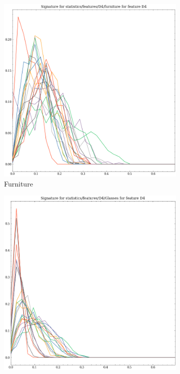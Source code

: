 \begin{figure}[t!p]
    \begin{subfigure}[b]{0.23\textwidth}
        \includegraphics[width=\textwidth]{assets/feature_extraction/D4/furniture.png}
        \caption{Furniture}
    \end{subfigure}
    \hfill
    \begin{subfigure}[b]{0.23\textwidth}
        \includegraphics[width=\textwidth]{assets/feature_extraction/D4/Glasses.png}

\end{subfigure}
\end{figure}
